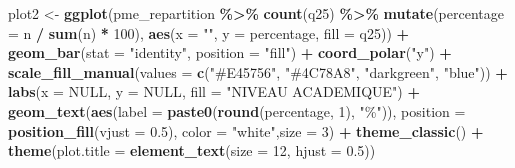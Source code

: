 \documentclass[
]{article}
\newenvironment{Shaded}{\begin{snugshade}}{\end{snugshade}}
\newcommand{\AttributeTok}[1]{\textcolor[rgb]{0.13,0.29,0.53}{#1}}
\newcommand{\ConstantTok}[1]{\textcolor[rgb]{0.56,0.35,0.01}{#1}}
\newcommand{\DecValTok}[1]{\textcolor[rgb]{0.00,0.00,0.81}{#1}}
\newcommand{\FloatTok}[1]{\textcolor[rgb]{0.00,0.00,0.81}{#1}}
\newcommand{\FunctionTok}[1]{\textcolor[rgb]{0.13,0.29,0.53}{\textbf{#1}}}
\newcommand{\NormalTok}[1]{#1}
\newcommand{\OtherTok}[1]{\textcolor[rgb]{0.56,0.35,0.01}{#1}}
\newcommand{\SpecialCharTok}[1]{\textcolor[rgb]{0.81,0.36,0.00}{\textbf{#1}}}
\newcommand{\StringTok}[1]{\textcolor[rgb]{0.31,0.60,0.02}{#1}}
\begin{document}
\begin{Shaded}
\begin{Highlighting}[]
\NormalTok{plot2 }\OtherTok{\textless{}{-}} \FunctionTok{ggplot}\NormalTok{(pme\_repartition }\SpecialCharTok{\%\textgreater{}\%}
                 \FunctionTok{count}\NormalTok{(q25) }\SpecialCharTok{\%\textgreater{}\%}
                 \FunctionTok{mutate}\NormalTok{(}\AttributeTok{percentage =}\NormalTok{ n }\SpecialCharTok{/} \FunctionTok{sum}\NormalTok{(n) }\SpecialCharTok{*} \DecValTok{100}\NormalTok{), }
                \FunctionTok{aes}\NormalTok{(}\AttributeTok{x =} \StringTok{""}\NormalTok{, }\AttributeTok{y =}\NormalTok{ percentage, }\AttributeTok{fill =}\NormalTok{ q25)) }\SpecialCharTok{+}
  \FunctionTok{geom\_bar}\NormalTok{(}\AttributeTok{stat =} \StringTok{"identity"}\NormalTok{, }\AttributeTok{position =} \StringTok{"fill"}\NormalTok{) }\SpecialCharTok{+}
  \FunctionTok{coord\_polar}\NormalTok{(}\StringTok{"y"}\NormalTok{) }\SpecialCharTok{+}
  \FunctionTok{scale\_fill\_manual}\NormalTok{(}\AttributeTok{values =} \FunctionTok{c}\NormalTok{(}\StringTok{"\#E45756"}\NormalTok{, }\StringTok{"\#4C78A8"}\NormalTok{, }\StringTok{"darkgreen"}\NormalTok{, }\StringTok{"blue"}\NormalTok{)) }\SpecialCharTok{+}
  \FunctionTok{labs}\NormalTok{(}\AttributeTok{x =} \ConstantTok{NULL}\NormalTok{, }\AttributeTok{y =} \ConstantTok{NULL}\NormalTok{, }\AttributeTok{fill =} \StringTok{"NIVEAU ACADEMIQUE"}\NormalTok{) }\SpecialCharTok{+}
  \FunctionTok{geom\_text}\NormalTok{(}\FunctionTok{aes}\NormalTok{(}\AttributeTok{label =} \FunctionTok{paste0}\NormalTok{(}\FunctionTok{round}\NormalTok{(percentage, }\DecValTok{1}\NormalTok{), }\StringTok{"\%"}\NormalTok{)), }
            \AttributeTok{position =} \FunctionTok{position\_fill}\NormalTok{(}\AttributeTok{vjust =} \FloatTok{0.5}\NormalTok{), }\AttributeTok{color =} \StringTok{"white"}\NormalTok{,}\AttributeTok{size =} \DecValTok{3}\NormalTok{) }\SpecialCharTok{+}
  \FunctionTok{theme\_classic}\NormalTok{() }\SpecialCharTok{+}
  \FunctionTok{theme}\NormalTok{(}\AttributeTok{plot.title =} \FunctionTok{element\_text}\NormalTok{(}\AttributeTok{size =} \DecValTok{12}\NormalTok{, }\AttributeTok{hjust =} \FloatTok{0.5}\NormalTok{))}


\end{Highlighting}
\end{Shaded}
\end{document}
